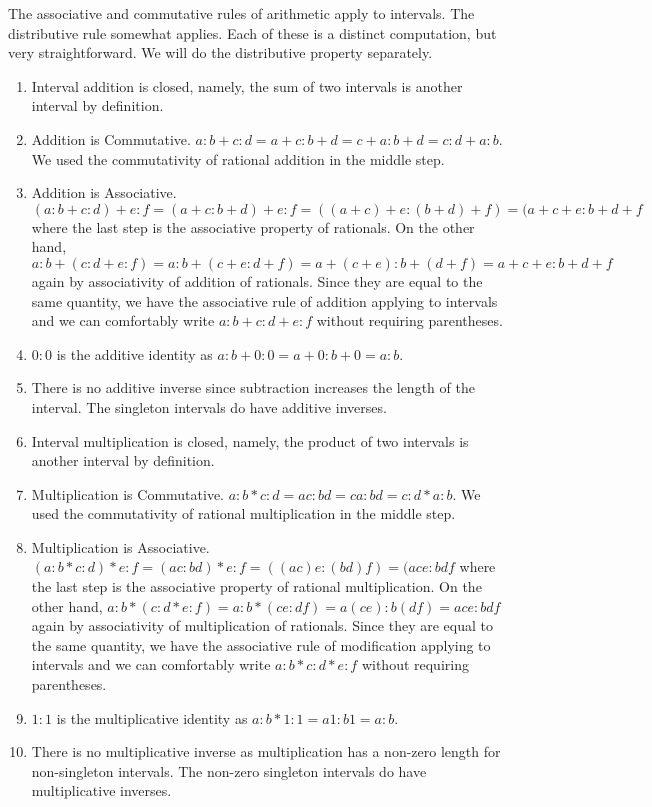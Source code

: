 \documentclass[12pt]{article}
\theoremstyle{remark}
\begin{document}
The associative and commutative rules of arithmetic apply to intervals. The distributive rule somewhat applies. Each of these is a distinct computation, but very straightforward. We will do the distributive property separately. 

\begin{enumerate}
    \item Interval addition is closed, namely, the sum of two intervals is another interval by definition. 
    \item Addition is Commutative. $a:b + c:d= a+c : b+d = c+a:b+d = c:d + a:b$. We used the commutativity of rational addition in the middle step. 
    \item Addition is Associative. $(a:b + c:d) + e:f = (a+c:b+d)+e:f = ((a+c)+e:(b+d)+f) = (a+c+e:b+d+f$ where the last step is the associative property of rationals.  On the other hand, $a:b + (c:d+e:f) = a:b + (c+e:d+f) = a+(c+e):b+(d+f) = a+c+e:b+d+f$ again by associativity of addition of rationals. Since they are equal to the same quantity, we have the associative rule of addition applying to intervals and we can comfortably write $a:b + c:d + e:f$ without requiring parentheses. 
    \item $0:0$ is the additive identity as $a:b+0:0 = a+0:b+0 = a:b$. 
    \item There is no additive inverse since subtraction increases the length of the interval. The singleton intervals do have additive inverses. 
    \item Interval multiplication is closed, namely, the product of two intervals is another interval by definition. 
    \item Multiplication is Commutative. $a:b * c:d= ac : bd = ca:bd = c:d * a:b$. We used the commutativity of rational multiplication in the middle step. 
    \item Multiplication is Associative. $(a:b * c:d) * e:f = (ac:bd)*e:f = ((ac)e:(bd)f) = (ace:bdf$ where the last step is the associative property of rational multiplication.  On the other hand, $a:b * (c:d*e:f) = a:b * (ce:df) = a(ce):b(df) = ace:bdf$ again by associativity of multiplication of rationals. Since they are equal to the same quantity, we have the associative rule of modification applying to intervals and we can comfortably write $a:b * c:d * e:f$ without requiring parentheses.     
    \item $1:1$ is the multiplicative identity as $a:b*1:1 = a1:b1 = a:b$. 
    \item There is no multiplicative inverse as multiplication has a non-zero length for non-singleton intervals. The non-zero singleton intervals do have multiplicative inverses. 
\end{enumerate}
\end{document}
